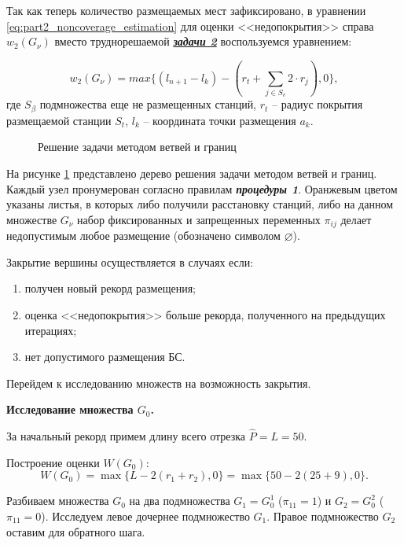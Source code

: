 Так как теперь количество размещаемых мест зафиксировано, в уравнении \cref{eq:part2_noncoverage_estimation} для оценки <<недопокрытия>> справа $w_2 \left(G_\nu \right)$ вместо труднорешаемой \underline{\textit{\textbf{задачи 2}}} воспользуемся уравнением:

\begin{equation}\label{eq:part4_noncoverage_estimation2}
  w_2 \left(G_\nu \right) = max\{\left(l_{n+1}-l_k\right)-(r_t+\sum_{j\in S_v}{2 \cdot r_j}),0\},
\end{equation}
где $S_\beta$ подмножества еще не размещенных станций, $r_t$ -- радиус покрытия размещаемой станции $S_t$, $l_k$ -- координата точки размещения $a_k$.

\begin{figure}[ht]
  \caption{Решение задачи методом ветвей и границ}\label{fig:part2_branch_and_bound_tree}
\end{figure}


На рисунке \cref{fig:part2_branch_and_bound_tree} представлено дерево решения задачи методом ветвей и границ. Каждый узел пронумерован согласно правилам \textit{\textbf{процедуры 1}}. Оранжевым цветом указаны листья, в которых либо получили расстановку станций, либо на данном множестве $G_\nu$ набор фиксированных и запрещенных переменных $\pi_{ij}$ делает недопустимым любое размещение (обозначено символом $\varnothing$).

Закрытие вершины осуществляется в случаях если:
\begin{enumerate}
  \item получен новый рекорд размещения;
  \item оценка <<недопокрытия>> больше рекорда, полученного на предыдущих итерациях;
  \item нет допустимого размещения БС.
\end{enumerate} 
Перейдем к исследованию множеств на возможность закрытия.

\textbf{Исследование множества $G_0$.}

За начальный рекорд примем длину всего отрезка $\widehat{P} = L = 50$.

Построение оценки $W(G_0)$:
$$
W(G_0)= \max\{L-2(r_1 + r_2), 0\} = \max\{50 -2(25+9), 0 \}.
$$

Разбиваем множества $G_0$ на два подмножества $G_1 = G^1_0$ ($\pi_{11} = 1$) и $G_2 = G^2_0$ ($\pi_{11} = 0$). Исследуем левое дочернее подмножество $G_1$. Правое подмножество $G_2$ оставим для обратного шага.

